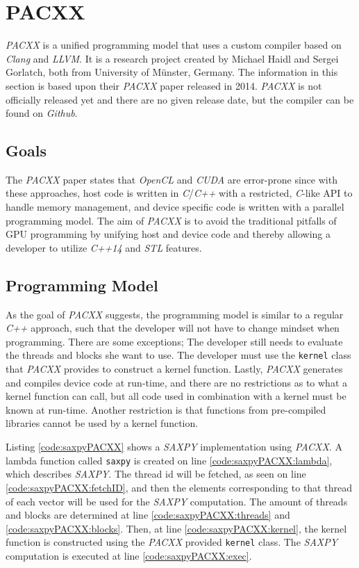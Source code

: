 \section{PACXX}
\textit{PACXX} is a unified programming model that uses a custom compiler based on \textit{Clang} and \textit{LLVM}. It is a research project created by Michael Haidl and Sergei Gorlatch, both from University of Münster, Germany. The information in this section is based upon their \textit{PACXX} paper released in 2014\cite{pacxxPaper}. \textit{PACXX} is not officially released yet and there are no given release date, but the compiler can be found on \textit{Github}\cite{pacxxGithub}.

\subsection{Goals}
The \textit{PACXX} paper states that \textit{OpenCL} and \textit{CUDA} are error-prone since with these approaches, host code is written in \textit{C}/\textit{C++} with a restricted, \textit{C}-like API to handle memory management, and device specific code is written with a parallel programming model. The aim of \textit{PACXX} is to avoid the traditional pitfalls of GPU programming by unifying host and device code and thereby allowing a developer to utilize \textit{C++14} and \textit{STL} features.

\subsection{Programming Model}
As the goal of \textit{PACXX} suggests, the programming model is similar to a regular \textit{C++} approach, such that the developer will not have to change mindset when programming. There are some exceptions; The developer still needs to evaluate the threads and blocks she want to use. The developer must use the \texttt{kernel} class that \textit{PACXX} provides to construct a kernel function. Lastly, \textit{PACXX} generates and compiles device code at run-time, and there are no restrictions as to what a kernel function can call, but all code used in combination with a kernel must be known at run-time. Another restriction is that functions from pre-compiled libraries cannot be used by a kernel function.

Listing \ref{code:saxpyPACXX} shows a \textit{SAXPY} implementation using \textit{PACXX}. A lambda function called \texttt{saxpy} is created on line \ref{code:saxpyPACXX:lambda}, which describes \textit{SAXPY}. The thread id will be fetched, as seen on line \ref{code:saxpyPACXX:fetchID}, and then the elements corresponding to that thread of each vector will be used for the \textit{SAXPY} computation. The amount of threads and blocks are determined at line \ref{code:saxpyPACXX:threads} and \ref{code:saxpyPACXX:blocks}. Then, at line \ref{code:saxpyPACXX:kernel}, the kernel function is constructed using the \textit{PACXX} provided \texttt{kernel} class. The \textit{SAXPY} computation is executed at line \ref{code:saxpyPACXX:exec}.

